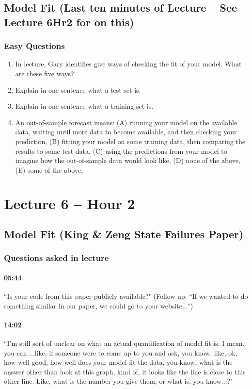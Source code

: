 \documentclass[11pt]{article}
\begin{document}
\subsection{Model Fit (Last ten minutes of Lecture -- See Lecture 6Hr2 for on this)}

\subsubsection{Easy Questions}

\begin{enumerate}
\item In lecture, Gary identifies give ways of checking the fit of your model.  What are these five ways?
\item Explain in one sentence what a test set is.
\item Explain in one sentence what a training set is.
\item An out-of-sample forecast means: (A) running your model on the available data, waiting until more data to become available, and then checking your prediction, (B) fitting your model on some training data, then comparing the results to some test data, (C) using the predictions from your model to imagine how the out-of-sample data would look like, (D) none of the above, (E) some of the above.
\end{enumerate}


\section{Lecture 6 -- Hour 2}

\subsection{Model Fit (King \& Zeng State Failures Paper)}

\subsubsection{Questions asked in lecture}

\paragraph{05:44} ``Is your code from this paper publicly available?" (Follow up: ``If we wanted to do something similar in our paper, we could go to your website...")

\paragraph{14:02} ``I'm still sort of unclear on what an actual quantification of model fit is. I mean, you can ...like, if someone were to come up to you and ask, you know, like, ok, how well good, how well does your model fit the data, you know, what is the answer other than look at this graph, kind of, it looks like the line is close to this other line. Like, what is the number you give them, or what is, you know...?"
\end{document}
